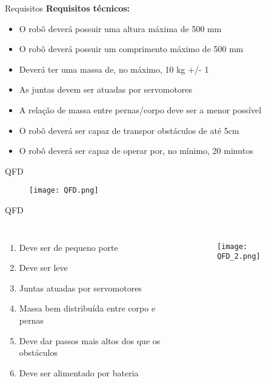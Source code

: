 \begin{frame}[t]{Requisitos}
    \textbf{Requisitos técnicos:}
    \begin{itemize}
        \item O robô deverá possuir uma altura máxima de 500 mm
        \item O robô deverá possuir um comprimento máximo de 500 mm
        \item Deverá ter uma massa de, no máximo, 10 kg +/- 1
        \item As juntas devem ser atuadas por servomotores
        \item A relação de massa entre pernas/corpo deve ser a menor possível
        \item O robô deverá ser capaz de transpor obstáculos de até 5cm
        \item O robô deverá ser capaz de operar por, no mínimo, 20 minutos
    \end{itemize}

\end{frame}

\begin{frame}[t]{QFD}
    \begin{figure}
        \texttt{[image: QFD.png]}
    \end{figure}

\end{frame}

\begin{frame}[t]{QFD}
    \begin{columns}
        \begin{enumerate}
            \item Deve ser de pequeno porte
            \item Deve ser leve
            \item Juntas atuadas por servomotores
            \item Massa bem distribuída entre corpo e pernas
            \item Deve dar passos mais altos dos que os obstáculos
            \item Deve ser alimentado por bateria
        \end{enumerate}
        \begin{figure}
            \texttt{[image: QFD\_2.png]}
        \end{figure}
    \end{columns}

\end{frame}
